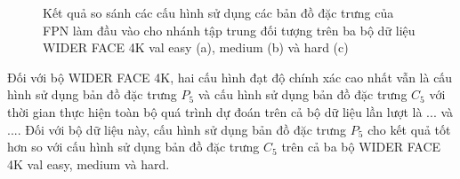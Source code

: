 {    \begin{figure}[H]
        \centering
        \caption{Kết quả so sánh các cấu hình sử dụng các bản đồ đặc trưng của FPN làm đầu vào cho nhánh tập trung đối tượng trên ba bộ dữ liệu WIDER FACE 4K val easy (a), medium (b) và hard (c)}
        \label{fig:retinafocus_widerface_4k_val_fpn}
    \end{figure}

    \noindent
    Đối với bộ WIDER FACE 4K, hai cấu hình đạt độ chính xác cao nhất vẫn là cấu hình sử dụng bản đồ đặc trưng ${P}_{5}$ và cấu hình sử dụng bản đồ đặc trưng ${C}_{5}$ với thời gian thực hiện toàn bộ quá trình dự đoán trên cả bộ dữ liệu lần lượt là ... và ....
    Đối với bộ dữ liệu này, cấu hình sử dụng bản đồ đặc trưng ${P}_{5}$ cho kết quả tốt hơn so với cấu hình sử dụng bản đồ đặc trưng ${C}_{5}$ trên cả ba bộ WIDER FACE 4K val easy, medium và hard.

}
